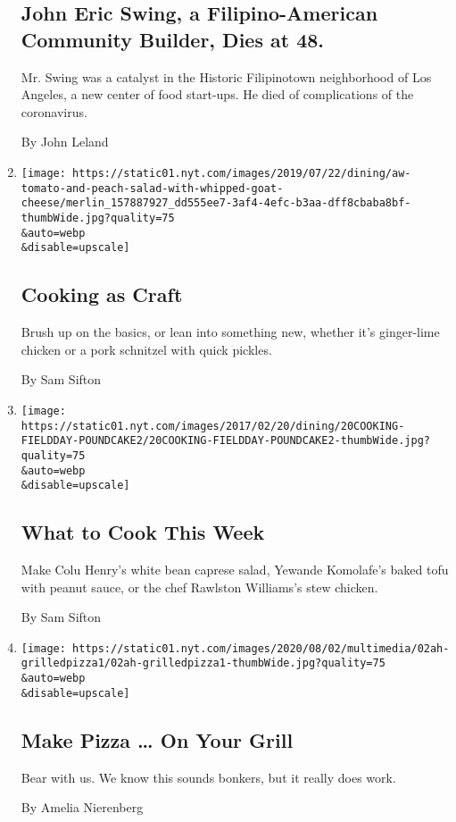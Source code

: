 \begin{enumerate}
  \hypertarget{john-eric-swing-a-filipino-american-community-builder-dies-at-48}{%
  \subsection{John Eric Swing, a Filipino-American Community Builder,
  Dies at
  48.}\label{john-eric-swing-a-filipino-american-community-builder-dies-at-48}}

  Mr. Swing was a catalyst in the Historic Filipinotown neighborhood of
  Los Angeles, a new center of food start-ups. He died of complications
  of the coronavirus.

  By John Leland
\item
  \href{/2020/08/03/dining/cooking-as-craft.html}{}

  \texttt{[image: https://static01.nyt.com/images/2019/07/22/dining/aw-tomato-and-peach-salad-with-whipped-goat-cheese/merlin\_157887927\_dd555ee7-3af4-4efc-b3aa-dff8cbaba8bf-thumbWide.jpg?quality=75\\\&auto=webp\\\&disable=upscale]}

  \hypertarget{cooking-as-craft}{%
  \subsection{Cooking as Craft}\label{cooking-as-craft}}

  Brush up on the basics, or lean into something new, whether it's
  ginger-lime chicken or a pork schnitzel with quick pickles.

  By Sam Sifton
\item
  \href{/2020/08/02/dining/what-to-cook-this-week.html}{}

  \texttt{[image: https://static01.nyt.com/images/2017/02/20/dining/20COOKING-FIELDDAY-POUNDCAKE2/20COOKING-FIELDDAY-POUNDCAKE2-thumbWide.jpg?quality=75\\\&auto=webp\\\&disable=upscale]}

  \hypertarget{what-to-cook-this-week}{%
  \subsection{What to Cook This Week}\label{what-to-cook-this-week}}

  Make Colu Henry's white bean caprese salad, Yewande Komolafe's baked
  tofu with peanut sauce, or the chef Rawlston Williams's stew chicken.

  By Sam Sifton
\item
  \href{/2020/08/01/at-home/coronavirus-make-pizza-on-a-grill.html}{}

  \texttt{[image: https://static01.nyt.com/images/2020/08/02/multimedia/02ah-grilledpizza1/02ah-grilledpizza1-thumbWide.jpg?quality=75\\\&auto=webp\\\&disable=upscale]}

  \hypertarget{make-pizza--on-your-grill}{%
  \subsection{Make Pizza \ldots{} On Your
  Grill}\label{make-pizza--on-your-grill}}

  Bear with us. We know this sounds bonkers, but it really does work.

  By Amelia Nierenberg
\end{enumerate}

